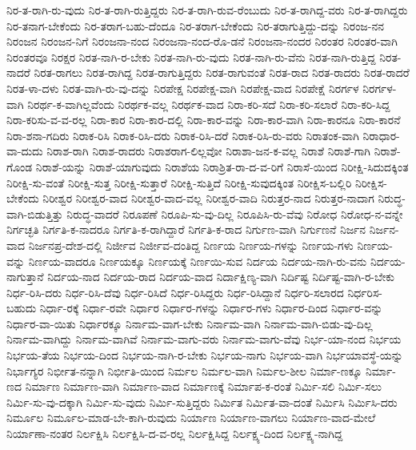 {ನಿರ-ತ-ರಾಗಿ-ರು-ವುದು
ನಿರ-ತ-ರಾಗಿ-ರುತ್ತಿದ್ದರು
ನಿರ-ತ-ರಾಗಿ-ರುವ-ರೆಂಬುದು
ನಿರ-ತ-ರಾಗಿದ್ದ-ವರು
ನಿರ-ತ-ರಾಗಿದ್ದರು
ನಿರ-ತನಾಗ-ಬೇಕೆಂದು
ನಿರ-ತರಾಗ-ಬಹು-ದೆಂದೂ
ನಿರ-ತರಾಗ-ಬೇಕೆಂದು
ನಿರ-ತರಾಗುತ್ತಿದ್ದು-ದನ್ನು
ನಿರಂಜ-ನನ
ನಿರಂಜನ
ನಿರಂಜನ-ನಿಗೆ
ನಿರಂಜನಾ-ನಂದ
ನಿರಂಜನಾ-ನಂದ-ರೊ-ಡನೆ
ನಿರಂಜನಾ-ನಂದರ
ನಿರಂತರ
ನಿರಂತರ-ವಾಗಿ
ನಿರಂತರವೂ
ನಿರಕ್ಷರ
ನಿರತ-ನಾಗಿ-ರ-ಬೇಕು
ನಿರತ-ನಾಗಿ-ರು-ವುದು
ನಿರತ-ನಾಗಿ-ರು-ವೆನು
ನಿರತ-ನಾಗಿ-ರುತ್ತಿದ್ದ
ನಿರತ-ನಾದರೆ
ನಿರತ-ರಾಗಲು
ನಿರತ-ರಾಗಿದ್ದ
ನಿರತ-ರಾಗುತ್ತಿದ್ದರು
ನಿರತ-ರಾಗುವಂತೆ
ನಿರತ-ರಾದ
ನಿರತ-ರಾದರು
ನಿರತ-ರಾದರೆ
ನಿರತ-ಳಾ-ದಳು
ನಿರತ-ವಾಗಿ-ರು-ವು-ದನ್ನು
ನಿರಪೇಕ್ಷ
ನಿರಪೇಕ್ಷ-ವಾಗಿ
ನಿರಪೇಕ್ಷ-ವಾದ
ನಿರಪೇಕ್ಷೆ
ನಿರರ್ಗಳ
ನಿರರ್ಗಳ-ವಾಗಿ
ನಿರರ್ಥ-ಕ-ವಾಗಿಲ್ಲವೆಂದು
ನಿರರ್ಥಕ-ವಲ್ಲ
ನಿರರ್ಥಕ-ವಾದ
ನಿರಾ-ಕರಿ-ಸದೆ
ನಿರಾ-ಕರಿ-ಸಲಾರೆ
ನಿರಾ-ಕರಿ-ಸಿದ್ದ
ನಿರಾ-ಕರಿಸು-ವ-ವ-ರಲ್ಲ
ನಿರಾ-ಕಾರ
ನಿರಾ-ಕಾರ-ದಲ್ಲಿ
ನಿರಾ-ಕಾರ-ವನ್ನು
ನಿರಾ-ಕಾರ-ವಾಗಿ
ನಿರಾ-ಕಾರನೂ
ನಿರಾ-ಕಾರನೆ
ನಿರಾ-ಶನಾ-ಗದಿರು
ನಿರಾಕ-ರಿಸಿ
ನಿರಾಕ-ರಿಸಿ-ದರು
ನಿರಾಕ-ರಿಸಿ-ದರೆ
ನಿರಾಕ-ರಿಸಿ-ರು-ವರು
ನಿರಾತಂಕ-ವಾಗಿ
ನಿರಾಧಾರ-ವಾ-ದುದು
ನಿರಾಶ-ರಾಗಿ
ನಿರಾಶ-ರಾದರು
ನಿರಾಶರಾಗ-ಲಿಲ್ಲವೋ
ನಿರಾಶಾ-ಜನ-ಕ-ವಲ್ಲ
ನಿರಾಶೆ
ನಿರಾಶೆ-ಗಾಗಿ
ನಿರಾಶೆ-ಗೊಂಡ
ನಿರಾಶೆ-ಯನ್ನು
ನಿರಾಶೆ-ಯಾಗುವುದು
ನಿರಾಶೆಯ
ನಿರಾಶ್ರಿತ-ರಾ-ದ-ವ-ರಿಗೆ
ನಿರಾಸೆ-ಯಿಂದ
ನಿರೀಕ್ಷಿ-ಸಿದುದಕ್ಕಿಂತ
ನಿರೀಕ್ಷಿ-ಸು-ವಂತೆ
ನಿರೀಕ್ಷಿ-ಸುತ್ತ
ನಿರೀಕ್ಷಿ-ಸುತ್ತಾರೆ
ನಿರೀಕ್ಷಿ-ಸುತ್ತಿದೆ
ನಿರೀಕ್ಷಿ-ಸುವುದಕ್ಕಿಂತ
ನಿರೀಕ್ಷಿಸ-ಬಲ್ಲಿರಿ
ನಿರೀಕ್ಷಿಸ-ಬೇಕೆಂದು
ನಿರೀಶ್ವರ
ನಿರೀಶ್ವರ-ವಾದ
ನಿರೀಶ್ವರ-ವಾದ-ವಲ್ಲ
ನಿರೀಶ್ವರ-ವಾದಿ
ನಿರುತ್ತರ-ನಾದ
ನಿರುತ್ತರ-ನಾದಾಗ
ನಿರುದ್ಧ-ವಾಗಿ-ಬಿಡುತ್ತಿತ್ತು
ನಿರುದ್ಧ-ವಾದರೆ
ನಿರೂಪಣೆ
ನಿರೂಪಿ-ಸು-ವು-ದಿಲ್ಲ
ನಿರೂಪಿಸಿ-ರು-ವೆವು
ನಿರೋಧ
ನಿರೋಧ-ನ-ವನ್ನೇ
ನಿರ್ಗಚ್ಛತಿ
ನಿರ್ಗತಿ-ಕ-ನಾದರೂ
ನಿರ್ಗತಿ-ಕ-ರಾಗಿದ್ದಾರೆ
ನಿರ್ಗತಿ-ಕ-ರಾದ
ನಿರ್ಗುಣ-ವಾಗಿ
ನಿರ್ಗುಣನೆ
ನಿರ್ಜನ
ನಿರ್ಜನ-ವಾದ
ನಿರ್ಜನಪ್ರ-ದೇಶ-ದಲ್ಲಿ
ನಿರ್ಜೀವ
ನಿರ್ಜೀವ-ದಂತಿದ್ದ
ನಿರ್ಣಯ
ನಿರ್ಣಯ-ಗಳನ್ನು
ನಿರ್ಣಯ-ಗಳು
ನಿರ್ಣಯ-ವನ್ನು
ನಿರ್ಣಯ-ವಾದರೂ
ನಿರ್ಣಯಕ್ಕೂ
ನಿರ್ಣಯಕ್ಕೆ
ನಿರ್ಣಯಿ-ಸುವ
ನಿರ್ದಯ
ನಿರ್ದಯ-ನಾಗಿ-ರು-ವನು
ನಿರ್ದಯ-ನಾಗುತ್ತಾನೆ
ನಿರ್ದಯ-ನಾದ
ನಿರ್ದಯ-ರಾದ
ನಿರ್ದಯ-ವಾದ
ನಿರ್ದಾಕ್ಷಿಣ್ಯ-ವಾಗಿ
ನಿರ್ದಿಷ್ಟ
ನಿರ್ದಿಷ್ಟ-ವಾಗಿ-ರ-ಬೇಕು
ನಿರ್ಧ-ರಿಸಿ-ದರು
ನಿರ್ಧ-ರಿಸಿ-ದೆವು
ನಿರ್ಧ-ರಿಸಿದೆ
ನಿರ್ಧ-ರಿಸಿದ್ದರು
ನಿರ್ಧ-ರಿಸಿದ್ದಾನೆ
ನಿರ್ಧರಿ-ಸಲಾರದ
ನಿರ್ಧರಿಸ-ಬಹುದು
ನಿರ್ಧಾ-ರಕ್ಕೆ
ನಿರ್ಧಾ-ರವೇ
ನಿರ್ಧಾರ
ನಿರ್ಧಾರ-ಗಳನ್ನು
ನಿರ್ಧಾರ-ಗಳು
ನಿರ್ಧಾರ-ದಿಂದ
ನಿರ್ಧಾರ-ವನ್ನು
ನಿರ್ಧಾರ-ವಾ-ಯಿತು
ನಿರ್ಧಾರಕ್ಕೂ
ನಿರ್ನಾಮ-ವಾಗ-ಬೇಕು
ನಿರ್ನಾಮ-ವಾಗಿ
ನಿರ್ನಾಮ-ವಾಗಿ-ಬಿಡು-ವು-ದಿಲ್ಲ
ನಿರ್ನಾಮ-ವಾಗಿದ್ದು
ನಿರ್ನಾಮ-ವಾಗಿವೆ
ನಿರ್ನಾಮ-ವಾಗು-ವರು
ನಿರ್ನಾಮ-ವಾಗು-ವೆವು
ನಿರ್ಭ-ಯಾ-ನಂದ
ನಿರ್ಭಯ
ನಿರ್ಭಯ-ತೆಯ
ನಿರ್ಭಯ-ದಿಂದ
ನಿರ್ಭಯ-ನಾಗಿ-ರ-ಬೇಕು
ನಿರ್ಭಯ-ನಾಗು
ನಿರ್ಭಯ-ವಾಗಿ
ನಿರ್ಭಯಾವಸ್ಥೆ-ಯನ್ನು
ನಿರ್ಭಾಗ್ಯರ
ನಿರ್ಭೀತ-ನನ್ನಾಗಿ
ನಿರ್ಭೀತಿ-ಯಿಂದ
ನಿರ್ಮಲ
ನಿರ್ಮಲ-ವಾಗಿ
ನಿರ್ಮಲ-ಶೀಲ
ನಿರ್ಮಾ-ಣಕ್ಕೂ
ನಿರ್ಮಾ-ಣದ
ನಿರ್ಮಾಣ
ನಿರ್ಮಾಣ-ವಾಗಿ
ನಿರ್ಮಾಣ-ವಾದ
ನಿರ್ಮಾಣಕ್ಕೆ
ನಿರ್ಮಾಪ-ಕ-ರಂತೆ
ನಿರ್ಮಿ-ಸಲಿ
ನಿರ್ಮಿ-ಸಲು
ನಿರ್ಮಿ-ಸು-ವು-ದಕ್ಕಾಗಿ
ನಿರ್ಮಿ-ಸು-ವುದು
ನಿರ್ಮಿ-ಸುತ್ತಿದ್ದರು
ನಿರ್ಮಿತ
ನಿರ್ಮಿತ-ವಾ-ದಂತೆ
ನಿರ್ಮಿಸಿ
ನಿರ್ಮಿಸಿ-ದರು
ನಿರ್ಮೂಲ
ನಿರ್ಮೂಲ-ಮಾಡ-ಬೇ-ಕಾಗಿ-ರುವುದು
ನಿರ್ಯಾಣ
ನಿರ್ಯಾಣ-ವಾಗಲು
ನಿರ್ಯಾಣ-ವಾದ-ಮೇಲೆ
ನಿರ್ಯಾಣಾ-ನಂತರ
ನಿರ್ಲಕ್ಷಿಸಿ
ನಿರ್ಲಕ್ಷಿಸಿ-ದ-ವ-ರಲ್ಲ
ನಿರ್ಲಕ್ಷಿಸಿದ್ದ
ನಿರ್ಲಕ್ಷ್ಯ-ದಿಂದ
ನಿರ್ಲಕ್ಷ್ಯ-ನಾಗಿದ್ದ
}
